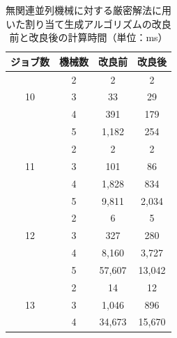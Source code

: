 \documentclass[12pt]{optlab-bachelor}
\begin{document}
\begin{table}[htb]
  \begin{center}
    \begin{tabular}{|c|c|c|c|} \hline
      ジョブ数 & 機械数 & 改良前 & 改良後 \\ \hline \hline
      & 2 & 2 & 2  \\ \cline{2-4}
      10 & 3 & 33 & 29  \\ \cline{2-4}
      & 4 & 391 & 179 \\ \cline{2-4}
      & 5 & 1,182 & 254  \\ \hline \hline
      & 2 & 2 & 2  \\ \cline{2-4}
      11 & 3 & 101 & 86 \\ \cline{2-4}
      & 4 & 1,828 & 834  \\ \cline{2-4}
      & 5 & 9,811 &  2,034 \\ \hline \hline
      & 2 & 6 & 5  \\ \cline{2-4}
      12 & 3 & 327 & 280  \\ \cline{2-4}
      & 4 & 8,160 & 3,727 \\ \cline{2-4}
      & 5 & 57,607 & 13,042 \\ \hline \hline
      & 2 & 14 & 12 \\ \cline{2-4}
      13 & 3 & 1,046 & 896 \\ \cline{2-4}
      & 4 & 34,673 & 15,670 \\ \hline \hline
    \end{tabular}
    \caption{無関連並列機械に対する厳密解法に用いた割り当て生成アルゴリズムの改良前と改良後の計算時間（単位：ms）}
    \label{A3}
  \end{center}
\end{table}
\end{document}
